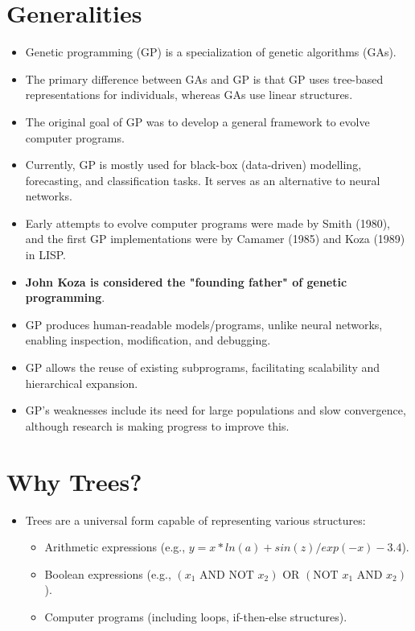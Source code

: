 \section{Generalities}
\begin{itemize}
    \item Genetic programming (GP) is a specialization of genetic algorithms (GAs).
    \item The primary difference between GAs and GP is that GP uses tree-based representations for individuals, whereas GAs use linear structures.
     \item The original goal of GP was to develop a general framework to evolve computer programs.
    \item  Currently, GP is mostly used for black-box (data-driven) modelling, forecasting, and classification tasks. It serves as an alternative to neural networks.
    \item Early attempts to evolve computer programs were made by Smith (1980), and the first GP implementations were by Camamer (1985) and Koza (1989) in LISP.
    \item \textbf{John Koza is considered the "founding father" of genetic programming}.
    \item GP produces human-readable models/programs, unlike neural networks, enabling inspection, modification, and debugging.
   \item GP allows the reuse of existing subprograms, facilitating scalability and hierarchical expansion.
    \item  GP's weaknesses include its need for large populations and slow convergence, although research is making progress to improve this.
\end{itemize}

\section{Why Trees?}
\begin{itemize}
    \item Trees are a universal form capable of representing various structures:
    \begin{itemize}
        \item Arithmetic expressions (e.g., $y = x * ln(a) + sin(z) / exp(-x) - 3.4$).
         \item Boolean expressions (e.g., $(x_1 \text{ AND NOT } x_2) \text{ OR } (\text{NOT } x_1 \text{ AND } x_2)$).
       \item Computer programs (including loops, if-then-else structures).
    \end{itemize}
\end{itemize}

